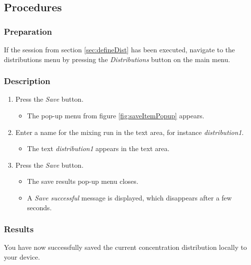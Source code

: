\subsection{Procedures}

\subsubsection{Preparation}
If the session from section \ref{sec:defineDist} has been executed, navigate to the distributions menu by pressing the \emph{Distributions} button on the main menu. 

\subsubsection{Description}
\begin{enumerate}
	\item Press the \emph{Save} button.
		\begin{itemize}
			\item The pop-up menu from figure \ref{fig:saveItemPopup} appears.
		\end{itemize}
	\item Enter a name for the mixing run in the text area, for instance \emph{distribution1}.
		\begin{itemize}
			\item The text \emph{distribution1} appears in the text area.
		\end{itemize}
	\item Press the \emph{Save} button.
		\begin{itemize}
			\item The save results pop-up menu closes.
			\item A \emph{Save successful} message is displayed, which disappears after a few seconds.
		\end{itemize}
\end{enumerate}

\subsubsection{Results}
You have now successfully saved the current concentration distribution locally to your device.

